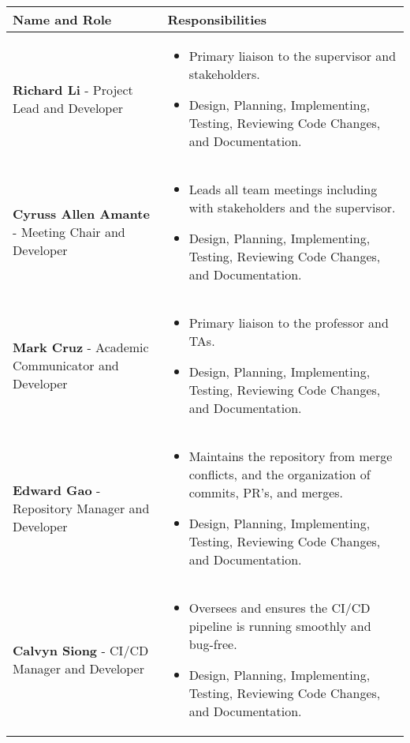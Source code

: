 \documentclass{article}
\begin{document}
\begin{center}
  \setlength{\arrayrulewidth}{0.1mm}
  \setlength{\tabcolsep}{7pt}
  \renewcommand{\arraystretch}{1.5}
  \begin{tabular}{ | m{4cm} | m{7cm} | } 
    \hline
      \textbf{Name and Role} & \textbf{Responsibilities} \\ 
      \hline
        \textbf{Richard Li} - Project Lead and Developer & \begin{itemize}
      \item Primary liaison to the supervisor and stakeholders.
      \item Design, Planning, Implementing, Testing, Reviewing Code Changes, and Documentation.
    \end{itemize}\\ 
      \hline
        \textbf{Cyruss Allen Amante} - Meeting Chair and Developer & \begin{itemize}
      \item Leads all team meetings including with stakeholders and the supervisor.
      \item Design, Planning, Implementing, Testing, Reviewing Code Changes, and Documentation.
    \end{itemize}\\ 
      \hline
        \textbf{Mark Cruz} - Academic Communicator and Developer & \begin{itemize}
      \item Primary liaison to the professor and TAs.
      \item Design, Planning, Implementing, Testing, Reviewing Code Changes, and Documentation.
    \end{itemize}\\ 
      \hline
        \textbf{Edward Gao} - Repository Manager and Developer & \begin{itemize}
      \item Maintains the repository from merge conflicts, and the organization of commits, PR's, and merges.
      \item Design, Planning, Implementing, Testing, Reviewing Code Changes, and Documentation.
    \end{itemize}\\ 
      \hline
        \textbf{Calvyn Siong} - CI/CD Manager and Developer & \begin{itemize}
      \item Oversees and ensures the CI/CD pipeline is running smoothly and bug-free.
      \item Design, Planning, Implementing, Testing, Reviewing Code Changes, and Documentation.
    \end{itemize}\\ 
      \hline

  \end{tabular}
\end{center}
\end{document}
